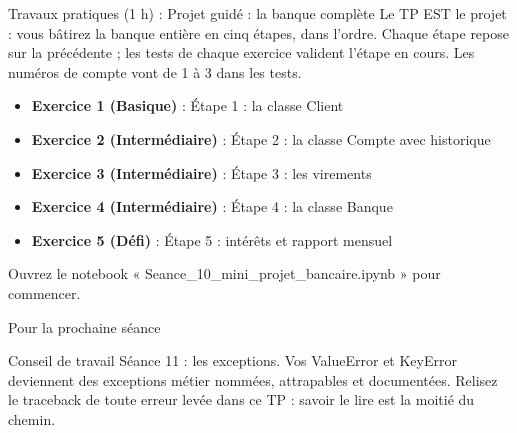 \documentclass[aspectratio=169,11pt]{beamer}
\begin{document}
\begin{frame}{Travaux pratiques (1 h) : Projet guidé : la banque complète}
Le TP EST le projet : vous bâtirez la banque entière en cinq étapes, dans l'ordre. Chaque étape repose sur la précédente ; les tests de chaque exercice valident l'étape en cours. Les numéros de compte vont de 1 à 3 dans les tests.

\begin{itemize}
  \setlength{\itemsep}{1.5pt}\setlength{\parskip}{0pt}
  \item \textbf{Exercice 1 (Basique)} : Étape 1 : la classe Client
  \item \textbf{Exercice 2 (Intermédiaire)} : Étape 2 : la classe Compte avec historique
  \item \textbf{Exercice 3 (Intermédiaire)} : Étape 3 : les virements
  \item \textbf{Exercice 4 (Intermédiaire)} : Étape 4 : la classe Banque
  \item \textbf{Exercice 5 (Défi)} : Étape 5 : intérêts et rapport mensuel
\end{itemize}
\vspace{4pt}

{\small\color{PyGris}Ouvrez le notebook « Seance\_10\_mini\_projet\_bancaire.ipynb » pour commencer.}
\end{frame}
\begin{frame}{Pour la prochaine séance}
\begin{exampleblock}{Conseil de travail}
Séance 11 : les exceptions. Vos ValueError et KeyError deviennent des exceptions métier nommées, attrapables et documentées. Relisez le traceback de toute erreur levée dans ce TP : savoir le lire est la moitié du chemin.
\end{exampleblock}
\end{frame}
\end{document}
